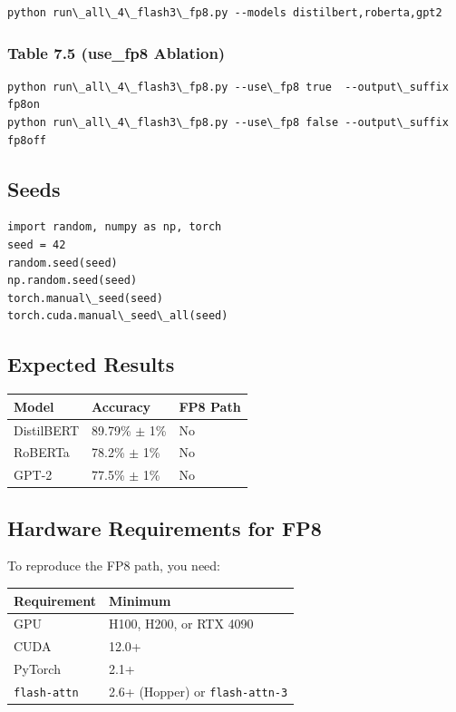 \begin{lstlisting}
python run\_all\_4\_flash3\_fp8.py --models distilbert,roberta,gpt2
\end{lstlisting}

\subsubsection{Table 7.5 (use\_fp8 Ablation)}

\begin{lstlisting}
python run\_all\_4\_flash3\_fp8.py --use\_fp8 true  --output\_suffix fp8on
python run\_all\_4\_flash3\_fp8.py --use\_fp8 false --output\_suffix fp8off
\end{lstlisting}

\subsection{Seeds}

\begin{lstlisting}
import random, numpy as np, torch
seed = 42
random.seed(seed)
np.random.seed(seed)
torch.manual\_seed(seed)
torch.cuda.manual\_seed\_all(seed)
\end{lstlisting}

\subsection{Expected Results}

\begin{table}[H]
\centering
\small
\begin{tabular}{lll}
\toprule
\textbf{Model} & \textbf{Accuracy} & \textbf{FP8 Path} \\
\midrule
DistilBERT & 89.79\% $\pm$ 1\% & No \\
RoBERTa & 78.2\% $\pm$ 1\% & No \\
GPT-2 & 77.5\% $\pm$ 1\% & No \\
\bottomrule
\end{tabular}
\end{table}

\subsection{Hardware Requirements for FP8}

To reproduce the FP8 path, you need:

\begin{table}[H]
\centering
\small
\begin{tabular}{ll}
\toprule
\textbf{Requirement} & \textbf{Minimum} \\
\midrule
GPU & H100, H200, or RTX 4090 \\
CUDA & 12.0+ \\
PyTorch & 2.1+ \\
\texttt{flash-attn} & 2.6+ (Hopper) or \texttt{flash-attn-3} \\
\bottomrule
\end{tabular}
\end{table}

